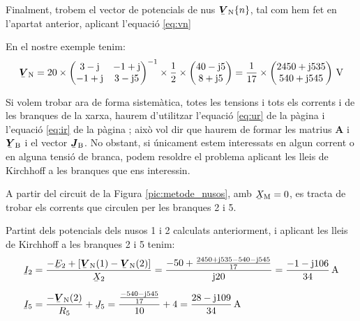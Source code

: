 Finalment,
trobem el vector de potencials de nus $\mcmplx{V}\ped{N}\{n\}$, tal
com  hem fet en l'apartat anterior, aplicant l'equaci\'{o} \eqref{eq:vn}

En el nostre exemple tenim:
\[
   \mcmplx{V}\ped{N} =
   20 \times \begin{pmatrix}
         3 - \ju  & -1 + \ju \\ -1 + \ju & 3 - \ju 5
   \end{pmatrix} ^{-1} \times
   \frac{1}{2} \times \begin{pmatrix}
         40 - \ju 5 \\
         8 + \ju 5
   \end{pmatrix} =
   \frac{1}{17} \times \begin{pmatrix}
         2450 + \ju 535 \\ 540  + \ju 545
   \end{pmatrix}\unit{V}
\]

Si volem trobar ara de forma sistem\`{a}tica, totes les tensions i tots
els corrents i  de les branques de la xarxa, haurem d'utilitzar
l'equaci\'{o} \eqref{eq:ur} de la p\`{a}gina \pageref{eq:ur} i l'equaci\'{o}
\eqref{eq:ir} de la p\`{a}gina \pageref{eq:ir}; aix\`{o} vol dir que haurem
de formar les matrius $\boldsymbol{A}$ i $\mcmplx{Y}\ped{B}$ i el
vector $\mcmplx{J}\ped{B}$. No obstant, si \'{u}nicament estem
interessats en algun corrent o en alguna tensi\'{o} de branca, podem
resoldre el problema aplicant les lleis de Kirchhoff a les branques
que ens interessin.


\begin{exemple}
A partir del circuit de la Figura \vref{pic:metode_nusos}, amb
$\cmplx{X}\ped{M}=0$, es tracta de trobar els corrents que circulen
per les branques 2 i 5.

Partint dels potencials dels nusos 1 i 2 calculats anteriorment, i
aplicant les lleis de Kirchhoff a les branques 2 i 5 tenim:
\begin{align*}
   \cmplx{I}_2 &= \frac{-\cmplx{E}_2 + [\mcmplx{V}\ped{N}(1) - \mcmplx{V}\ped{N}(2)]}
                  {\cmplx{X}_2} = \frac{-50 + \frac{2450+\ju 535 -540
                  - \ju 545}{17}} {\ju 20} = \frac{-1 - \ju 106}{34}\unit{A} \\[1.5ex]
   \cmplx{I}_5 &=  \frac{- \mcmplx{V}\ped{N}(2)}{R_5}  + \cmplx{J}_5 =
                  \frac{\frac{-540 - \ju 545}{17}}{10} + 4 =
                  \frac{28 - \ju 109}{34}\unit{A}
\end{align*}

\end{exemple}

